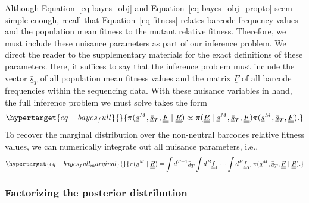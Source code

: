 \documentclass[
]{scrartcl}
\begin{document}
\begin{refsegment}
Although Equation~\ref{eq-bayes_obj} and
Equation~\ref{eq-bayes_obj_propto} seem simple enough, recall that
Equation~\ref{eq-fitness} relates barcode frequency values and the
population mean fitness to the mutant relative fitness. Therefore, we
must include these nuisance parameters as part of our inference problem.
We direct the reader to the supplementary materials for the exact
definitions of these parameters. Here, it suffices to say that the
inference problem must include the vector \(\underline{\bar{s}}_T\) of
all population mean fitness values and the matrix
\(\underline{\underline{F}}\) of all barcode frequencies within the
sequencing data. With these nuisance variables in hand, the full
inference problem we must solve takes the form
\begin{equation}\protect\hypertarget{eq-bayes_full}{}{
\pi(
    \underline{s}^M, \underline{\bar{s}}_T, \underline{\underline{F}} \mid
    \underline{\underline{R}}
) \propto
\pi(
    \underline{\underline{R}} \mid
    \underline{s}^M, \underline{\bar{s}}_T, \underline{\underline{F}}
)
\pi(
    \underline{s}^M, \underline{\bar{s}}_T, \underline{\underline{F}}
).
}\label{eq-bayes_full}\end{equation} To recover the marginal
distribution over the non-neutral barcodes relative fitness values, we
can numerically integrate out all nuisance parameters, i.e.,
\begin{equation}\protect\hypertarget{eq-bayes_full_marginal}{}{
\pi(\underline{s}^M \mid \underline{\underline{R}}) =
\int d^{T-1}\underline{\bar{s}}_T
\int d^{B}\underline{f}_1 \cdots
\int d^{B}\underline{f}_T
\;
\pi(
    \underline{s}^M, \underline{\bar{s}}_T, \underline{\underline{F}} \mid
    \underline{\underline{R}}
).
}\label{eq-bayes_full_marginal}\end{equation}

\hypertarget{seq-split_posterior}{%
\subsubsection{Factorizing the posterior
distribution}\label{seq-split_posterior}}


\end{refsegment}
\end{document}
